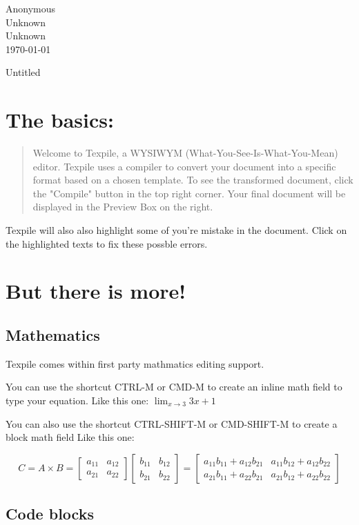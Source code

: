 \documentclass[12pt,letterpaper]{article}
\begin{document}
\noindent Anonymous\\Unknown\\Unknown\\\today\\
\begin{center}\textnormal{Untitled}\end{center}
\begin{flushleft}
\section{The basics:}
\begin{quote}

Welcome to Texpile, a WYSIWYM (What-You-See-Is-What-You-Mean) editor. Texpile uses a compiler to convert your document into a specific format based on a chosen template. To see the transformed document, click the "Compile" button in the top right corner. Your final document will be displayed in the Preview Box on the right.

\end{quote}


Texpile will also also highlight some of you're mistake in the document. Click on the highlighted texts to fix these possble errors.


\section{But there is more!}
\subsection{Mathematics}

Texpile comes within first party mathmatics editing support.

You can use the shortcut CTRL-M or CMD-M to create an inline math field to type your equation. Like this one: $\lim_{x\to3}3x+1$

You can also use the shortcut CTRL-SHIFT-M or CMD-SHIFT-M to create a block math field Like this one:


\[
C = A \times B = \begin{bmatrix}
a_{11} & a_{12} \\
a_{21} & a_{22}
\end{bmatrix}
\begin{bmatrix}
b_{11} & b_{12} \\
b_{21} & b_{22}
\end{bmatrix}
= \begin{bmatrix}
a_{11}b_{11} + a_{12}b_{21} & a_{11}b_{12} + a_{12}b_{22} \\
a_{21}b_{11} + a_{22}b_{21} & a_{21}b_{12} + a_{22}b_{22}
\end{bmatrix}
\]\subsection{Code blocks}


\end{flushleft}
\end{document}
